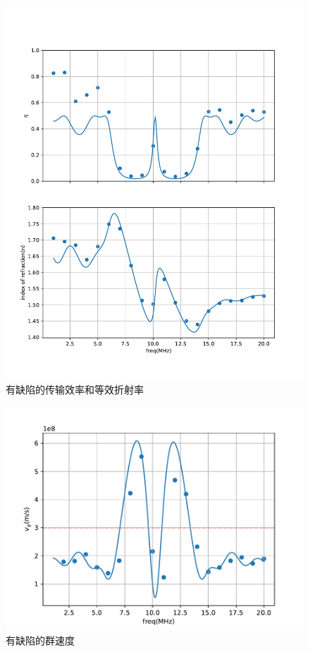 \documentclass[fleqn,10pt]{SelfArx} %
\begin{document}
\begin{figure}[htbp]
	\centering
	\includegraphics[width=\linewidth]{defects-eta-n.pdf}
	\caption{有缺陷的传输效率和等效折射率}
	\label{fig:a15}
\end{figure}
\begin{figure}[htbp]
	\centering
	\includegraphics[width=\linewidth]{defects-vg.pdf}
	\caption{有缺陷的群速度}
	\label{fig:a16}
\end{figure}
\end{document}
